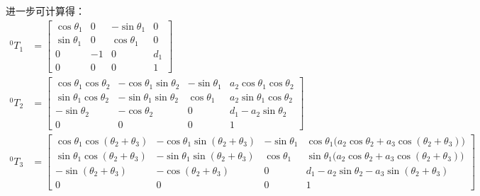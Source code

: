\documentclass[UTF8, 13pt]{ctexart}
\begin{document}
进一步可计算得：
\[
\begin{aligned}
    {}^0 T_1 &= \begin{bmatrix}
                    \cos\theta_1 & 0 & -\sin\theta_1 & 0 \\
                    \sin\theta_1 & 0 & \cos\theta_1 & 0 \\
                    0 & -1 & 0 & d_1 \\
                    0 & 0 & 0 & 1
                \end{bmatrix} \\
    {}^0 T_2 &= \begin{bmatrix}
                    \cos\theta_1\cos\theta_2 & -\cos\theta_1\sin\theta_2 & -\sin\theta_1 & a_2\cos\theta_1\cos\theta_2 \\
                    \sin\theta_1\cos\theta_2 & -\sin\theta_1\sin\theta_2 & \cos\theta_1 & a_2\sin\theta_1\cos\theta_2 \\
                    -\sin\theta_2 & -\cos\theta_2 & 0 & d_1 - a_2\sin\theta_2 \\
                    0 & 0 & 0 & 1
                \end{bmatrix} \\
    {}^0 T_3 &= \begin{bmatrix}
                    \cos\theta_1\cos(\theta_2+\theta_3) & -\cos\theta_1\sin(\theta_2+\theta_3) & -\sin\theta_1 & \cos\theta_1\big(a_2\cos\theta_2 + a_3\cos(\theta_2+\theta_3)\big) \\
                    \sin\theta_1\cos(\theta_2+\theta_3) & -\sin\theta_1\sin(\theta_2+\theta_3) & \cos\theta_1 & \sin\theta_1\big(a_2\cos\theta_2 + a_3\cos(\theta_2+\theta_3)\big) \\
                    -\sin(\theta_2+\theta_3) & -\cos(\theta_2+\theta_3) & 0 & d_1 - a_2\sin\theta_2 - a_3\sin(\theta_2+\theta_3) \\
                    0 & 0 & 0 & 1
                \end{bmatrix} \\
\end{aligned}
\]
\end{document}
